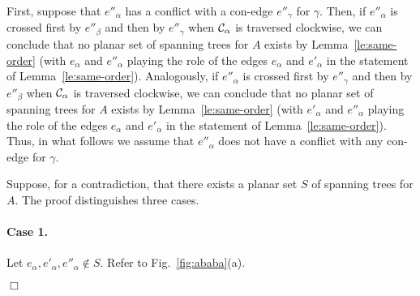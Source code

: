\documentclass[letter,runningheads]{llncs}
\renewenvironment{proof}
{{\em Proof.\ }}{\hspace*{\fill}$\Box$\par\vspace{2mm}}
\begin{document}
\begin{proof}
First, suppose that $e''_{\alpha}$ has a conflict with a con-edge $e''_{\gamma}$ for $\gamma$. Then, if $e''_{\alpha}$ is crossed first by $e''_{\beta}$ and then by $e''_{\gamma}$ when ${\cal C}_{\alpha}$ is traversed clockwise, we can conclude that no planar set of spanning trees for $A$ exists by Lemma~\ref{le:same-order} (with $e_{\alpha}$ and $e''_{\alpha}$ playing the role of the edges $e_{\alpha}$ and $e'_{\alpha}$ in the statement of Lemma~\ref{le:same-order}). Analogously, if $e''_{\alpha}$ is crossed first by $e''_{\gamma}$ and then by $e''_{\beta}$ when ${\cal C}_{\alpha}$ is traversed clockwise, we can conclude that no planar set of spanning trees for $A$ exists by Lemma~\ref{le:same-order} (with $e'_{\alpha}$ and $e''_{\alpha}$ playing the role of the edges $e_{\alpha}$ and $e'_{\alpha}$ in the statement of Lemma~\ref{le:same-order}). Thus, in what follows we assume that $e''_{\alpha}$ does not have a conflict with any con-edge for $\gamma$.

Suppose, for a contradiction, that there exists a planar set $S$ of spanning trees for $A$. The proof distinguishes three cases.

\paragraph{Case 1.} Let $e_{\alpha},e'_{\alpha},e''_{\alpha} \notin S$. Refer to Fig.~\ref{fig:ababa}(a).


\end{proof}
\end{document}

